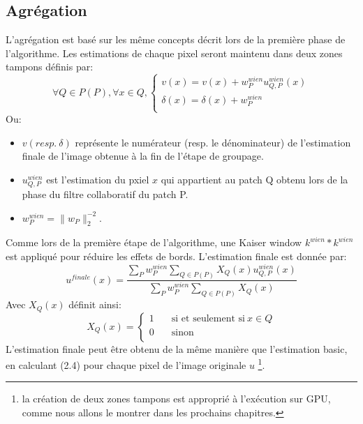\subsection{Agrégation}
L'agrégation est basé sur les même concepts décrit lors de la première phase de l'algorithme. Les estimations de chaque pixel seront maintenu dans deux zones tampons définis par:
\[ \forall Q \in  P(P), \forall x \in Q, 
  \begin{cases}
    v(x) = v(x) + w^{wien}_P u^{wien}_{Q,P}(x) \\
    \delta(x) = \delta(x) + w^{wien}_P  \\
  \end{cases}
\]
Ou:
\begin{itemize}
\item \(v (resp. \: \delta ) \) représente le numérateur (resp. le dénominateur) de l'estimation finale de l'image obtenue à la fin de l'étape de groupage.
\item \(u^{wien}_{Q,P} \) est l'estimation du pxiel \(x \) qui appartient au patch Q obtenu lors de la phase du filtre collaboratif du patch P.
\item \( w^{wien}_P  = \parallel w_P \parallel^{-2}_2 \). 
\end{itemize}
Comme lors de la première étape de l'algorithme, une Kaiser window \(k^{wien} * k^{wien}\) est appliqué pour réduire les effets de bords. L'estimation finale est donnée par:
\begin{equation}
u^{finale}(x) = \frac{\displaystyle\sum_{P}w^{wien}_P \displaystyle\sum_{Q \in P(P)}X_Q(x)u^{wien}_{Q,P}(x)}{\displaystyle\sum_{P}w^{wien}_P \displaystyle\sum_{Q \in P(P)}X_Q(x)}
\end{equation}
Avec \(X_Q(x)\) définit ainsi:
\[ X_Q(x) =
  \begin{cases}
    1       & \quad \text{si et seulement si} \: x  \in Q \\
    0       & \quad \text{sinon}\\
  \end{cases}
\]
L'estimation finale peut être obtenu de la même manière que l'estimation basic, en calculant (2.4) pour chaque pixel de l'image originale \(u\) \footnote{la création de deux zones tampons est approprié à l'exécution sur GPU, comme nous allons le montrer dans les prochains chapitres.}. 